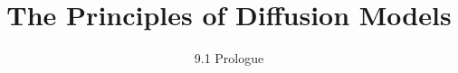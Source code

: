 
\title{The Principles of Diffusion Models}
\subtitle{9.1 Prologue}


\begin{frame}
    \titlepage
\end{frame}



